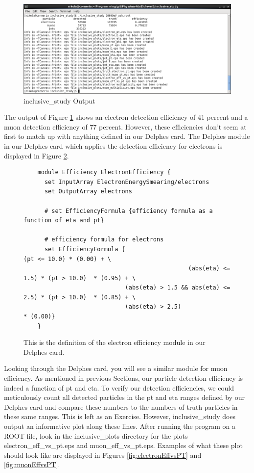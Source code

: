 \documentclass{article}
\begin{document}
\begin{figure}[!htbp]
	\centering
	\includegraphics[width = \linewidth]{inclusive_output_screenshot.png}
	\caption{inclusive\_study Output}
	\label{fig:inclusiveOutput}
\end{figure}

\bigskip

The output of Figure \ref{fig:inclusiveOutput} shows an electron detection efficiency of 41 percent and a muon detection efficiency
of 77 percent. However, these efficiencies don't seem at first to match up with anything defined in our Delphes card. The Delphes
module in our Delphes card which applies the detection efficiency for electrons is displayed in Figure \ref{fig:effModule}.

\begin{figure}[!htbp]
	\centering
	\begin{verbatim}
	module Efficiency ElectronEfficiency {
	  set InputArray ElectronEnergySmearing/electrons
	  set OutputArray electrons
	
	  # set EfficiencyFormula {efficiency formula as a function of eta and pt}
	
	  # efficiency formula for electrons
	  set EfficiencyFormula {                                      (pt <= 10.0) * (0.00) + \
	                                           (abs(eta) <= 1.5) * (pt > 10.0)  * (0.95) + \
	                         (abs(eta) > 1.5 && abs(eta) <= 2.5) * (pt > 10.0)  * (0.85) + \
	                         (abs(eta) > 2.5)                                   * (0.00)}
	}
	\end{verbatim}
	\caption{This is the definition of the electron efficiency module in our Delphes card.}
	\label{fig:effModule}
\end{figure}

\bigskip

Looking through the Delphes card, you will see a similar module for muon efficiency.
As mentioned in previous Sections, our particle detection efficiency is indeed a function of pt and eta.
To verify our detection efficiencies, we could meticulously count all detected particles
in the pt and eta ranges defined by our Delphes card and compare these numbers to the
numbers of truth particles in these same ranges. This is left as an Exercise. However, inclusive\_study
does output an informative plot along these lines. After running the program on a ROOT file, look in
the inclusive\_plots directory for the plots electron\_eff\_vs\_pt.eps and muon\_eff\_vs\_pt.eps.
Examples of what these plot should look like are displayed in Figures \ref{fig:electronEffvsPT} and \ref{fig:muonEffvsPT}.
\end{document}
